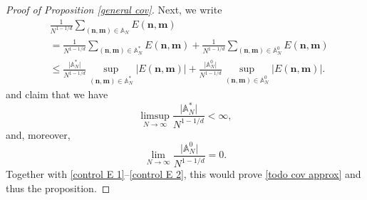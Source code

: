 \documentclass[a4paper,11pt]{article}
\numberwithin{equation}{section}
\theoremstyle{definition}
\newcommand{\eq}{\begin{equation}}
\newcommand{\qe}{\end{equation}}
\newcommand{\bs}{\boldsymbol}
\renewcommand{\leq}{\leqslant}
\begin{document}
\begin{proof}[Proof of Proposition \ref{general cov}]
Next, we write
\begin{align}
& \frac{1}{N^{1-1/d}}
\sum_{(\bs n,\bs m)\in\mathbb A_N}
E(\bs n,\bs m)\nonumber \\
& =\frac{1}{N^{1-1/d}}
\sum_{(\bs n,\bs m)\in\mathbb A_N^*}
E(\bs n,\bs m)+\frac{1}{N^{1-1/d}}
\sum_{(\bs n,\bs m)\in\mathbb A_N^0}
E(\bs n,\bs m)\nonumber\\
&\leq \frac{\big| \mathbb A_N^{*}\big| }{N^{1-1/d}}\sup_{(\bs n,\bs m)\in\mathbb A_N^*}\big|E(\bs n,\bs m)\big|
+
 \frac{\big| \mathbb A_N^{0}\big| }{N^{1-1/d}}\sup_{(\bs n,\bs m)\in\mathbb A_N^0}\big|E(\bs n,\bs m)\big|.
\end{align}
and claim that we have
\eq
\label{A* asympt}
\limsup_{N\to\infty}\frac{\big| \mathbb A_N^{*}\big| }{N^{1-1/d}}<\infty,
\qe
and,  moreover,
\eq
\label{A0 asympt}
\lim_{N\to\infty}\frac{\big| \mathbb A_N^{0}\big| }{N^{1-1/d}}=0.
\qe
Together with \eqref{control E 1}--\eqref{control E 2}, this would prove \eqref{todo cov approx} and thus the proposition.


\end{proof}
\end{document}
